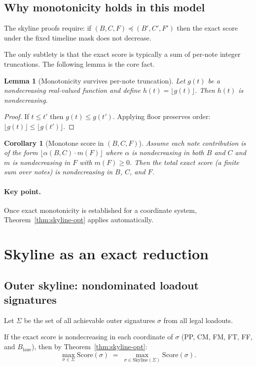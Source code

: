 \documentclass[11pt]{article}
\theoremstyle{plain}
\newtheorem{lemma}{Lemma}
\newtheorem{corollary}{Corollary}
\begin{document}
\subsection{Why monotonicity holds in this model}
The skyline proofs require: if $(B,C,F)\preceq (B',C',F')$ then the exact score under the fixed timeline mask does not decrease.

The only subtlety is that the exact score is typically a sum of per-note integer truncations. The following lemma is the core fact.

\begin{lemma}[Monotonicity survives per-note truncation]
\label{lem:floor-monotone}
Let $g(t)$ be a nondecreasing real-valued function and define $h(t)=\lfloor g(t)\rfloor$. Then $h(t)$ is nondecreasing.
\end{lemma}
\begin{proof}
If $t\le t'$ then $g(t)\le g(t')$. Applying floor preserves order: $\lfloor g(t)\rfloor\le\lfloor g(t')\rfloor$.
\end{proof}

\begin{corollary}[Monotone score in $(B,C,F)$]
\label{cor:monotone-bcf}
Assume each note contribution is of the form $\lfloor \alpha(B,C)\cdot m(F) \rfloor$ where $\alpha$ is nondecreasing in both $B$ and $C$ and $m$ is nondecreasing in $F$ with $m(F)\ge 0$. Then the total exact score (a finite sum over notes) is nondecreasing in $B$, $C$, and $F$.
\end{corollary}

\paragraph{Key point.} Once exact monotonicity is established for a coordinate system, Theorem~\ref{thm:skyline-opt} applies automatically.

\section{Skyline as an exact reduction}

\subsection{Outer skyline: nondominated loadout signatures}
Let $\Sigma$ be the set of all achievable outer signatures $\sigma$ from all legal loadouts.

If the exact score is nondecreasing in each coordinate of $\sigma$ (PP, CM, FM, FT, FF, and $B_{\mathrm{lane}}$), then by Theorem~\ref{thm:skyline-opt}:
\[
\max_{\sigma\in\Sigma} \mathrm{Score}(\sigma) 
\;=\;
\max_{\sigma\in\mathrm{Skyline}(\Sigma)} \mathrm{Score}(\sigma).
\]
\end{document}
